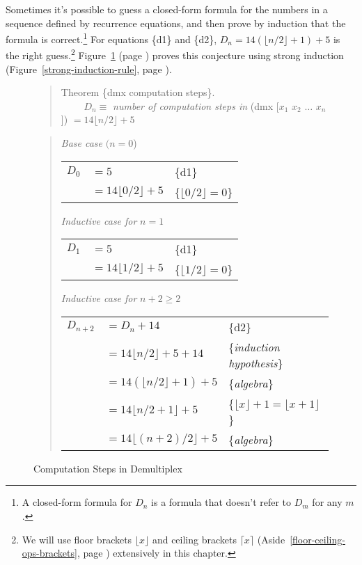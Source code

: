 Sometimes it's possible to guess a closed-form formula
for the numbers in a sequence defined by recurrence equations,
and then prove by induction that the formula is
correct.\footnote{A
\label{footnote:closed-form}closed-form formula
for $D_n$ is a formula
that doesn't refer to $D_m$ for any $m$.}
For equations \{d1\} and \{d2\},
$D_{n} = 14(\lfloor n/2\rfloor + 1) + 5$ is the right guess.\footnote{We
will use floor brackets $\lfloor x\rfloor$ and ceiling brackets $\lceil x\rceil$
(Aside~\ref{floor-ceiling-ops-brackets}, page \pageref{floor-ceiling-ops-brackets})
extensively in this chapter.}
Figure~\ref{fig:dmx-computation-time}
(page \pageref{fig:dmx-computation-time}) proves
this conjecture using strong induction
(Figure~\ref{strong-induction-rule}, page \pageref{strong-induction-rule}).

\begin{figure}
\begin{quote}
Theorem \{dmx computation steps\}. \\
~~~~ $D_n \equiv$ \emph{number of computation steps in} \textsf{(dmx [$x_1$ $x_2$ $\dots$ $x_n$])} $= 14\lfloor n/2\rfloor + 5$
\end{quote}
\begin{quote}
\emph{Base case} $(n=0$) \\
\begin{tabular}{lll}
$D_{0}$&$= 5$                        & \{d1\} \\
       &$= 14\lfloor 0/2\rfloor + 5$ & \{$\lfloor 0/2\rfloor=0$\} \\
\end{tabular}

\emph{Inductive case for} $n=1$\\
\begin{tabular}{lll}
$D_{1}$&$= 5$                        & \{d1\} \\
       &$= 14\lfloor 1/2\rfloor + 5$ & \{$\lfloor 1/2\rfloor=0$\} \\
\end{tabular}

\emph{Inductive case for} $n+2 \geq 2$\\
\begin{tabular}{lll}
$D_{n+2}$ &$= D_n + 14$                      & \{d2\} \\
          &$= 14\lfloor n/2\rfloor + 5 + 14$ & \{\emph{induction hypothesis}\} \\
          &$= 14(\lfloor n/2\rfloor + 1) + 5$& \{\emph{algebra}\} \\
          &$= 14\lfloor n/2 + 1\rfloor + 5$  & \{$\lfloor x\rfloor + 1 = \lfloor x+1\rfloor$\} \\
          &$= 14\lfloor(n+2)/2\rfloor + 5$   & \{\emph{algebra}\} \\
\end{tabular}
\end{quote}
\caption{Computation Steps in Demultiplex}
\label{fig:dmx-computation-time}
\end{figure}

